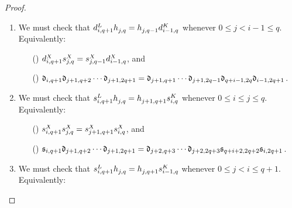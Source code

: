 \documentclass[11pt]{amsart}
\theoremstyle{plain}
\begin{document}
\begin{proof}
{\begin{enumerate}
\begin{enumerate}
\setlength{\parindent}{.25in}
\item[({\makebox[.51em][c]{a}})] $\trip{d}{j+1,q+1}{X}\circ \trip{s}{j,q}{X}=\trip{d}{j+1,q+1}{X}\circ \trip{s}{j+1,q}{X}$,\textup{ and}%
\item[({\makebox[.51em][c]{b}})]
$\frakd_{j+1,q+1}\circ
\frakd_{j+1,q+2}\circ\cdots \circ\frakd_{j+1,2q+1}=
\frakd_{j+1,q+1}\circ
\frakd_{j+2,q+2}\circ\cdots \circ\frakd_{j+2,2q+1}$.
\end{enumerate}
\item We must check that ${d}_{\smash{i,q+1}}^{\smash{L}}\relax {h}_{\smash{j,q}}^{\smash{}}={h}_{\smash{j,q-1}}^{\smash{}}\relax {d}_{\smash{i-1,q}}^{\smash{K}}$ whenever $0\leq j<i-1\leq q$. Equivalently:
\begin{enumerate}\squishlist
\setlength{\parindent}{.25in}
\item[({\makebox[.51em][c]{a}})] ${d}_{\smash{i,q+1}}^{\smash{X}}\relax {s}_{\smash{j,q}}^{\smash{X}}={s}_{\smash{j,q-1}}^{\smash{X}}\relax {d}_{\smash{i-1,q}}^{\smash{X}}$,\textup{ and}%
\item[({\makebox[.51em][c]{b}})] 
$\mathfrak{d}_{i,q+1}\relax
\mathfrak{d}_{j+1,q+2}\relax\cdots \relax\mathfrak{d}_{j+1,2q+1}=
\mathfrak{d}_{j+1,q+1}\relax\cdots \relax\mathfrak{d}_{j+1,2q-1}\relax
\mathfrak{d}_{q+i-1,2q}\relax\mathfrak{d}_{i-1,2q+1}$.
\end{enumerate}
\item We must check that ${s}_{\smash{i,q+1}}^{\smash{L}}\relax {h}_{\smash{j,q}}^{\smash{}}={h}_{\smash{j+1,q+1}}^{\smash{}}\relax {s}_{\smash{i,q}}^{\smash{K}}$ whenever $0\leq i\leq j\leq q$. Equivalently:
\begin{enumerate}\squishlist
\setlength{\parindent}{.25in}
\item[({\makebox[.51em][c]{a}})] ${s}_{\smash{i,q+1}}^{\smash{X}}\relax {s}_{\smash{j,q}}^{\smash{X}}={s}_{\smash{j+1,q+1}}^{\smash{X}}\relax {s}_{\smash{i,q}}^{\smash{X}}$,\textup{ and}%
\item[({\makebox[.51em][c]{b}})] 
$\mathfrak{s}_{i,q+1}\relax
\mathfrak{d}_{j+1,q+2}\relax\cdots \relax\mathfrak{d}_{j+1,2q+1}=
\mathfrak{d}_{j+2,q+3}\relax\cdots \relax\mathfrak{d}_{j+2,2q+3}\relax
\mathfrak{s}_{q+i+2,2q+2}\relax\mathfrak{s}_{i,2q+1}$.
\end{enumerate}
\item We must check that ${s}_{\smash{i,q+1}}^{\smash{L}}\relax {h}_{\smash{j,q}}^{\smash{}}={h}_{\smash{j,q+1}}^{\smash{}}\relax {s}_{\smash{i-1,q}}^{\smash{K}}$ whenever $0\leq j<i\leq q+1$. Equivalently:
\begin{enumerate}\squishlist
\setlength{\parindent}{.25in}

\end{enumerate}
\end{enumerate}}
\end{proof}
\end{document}
